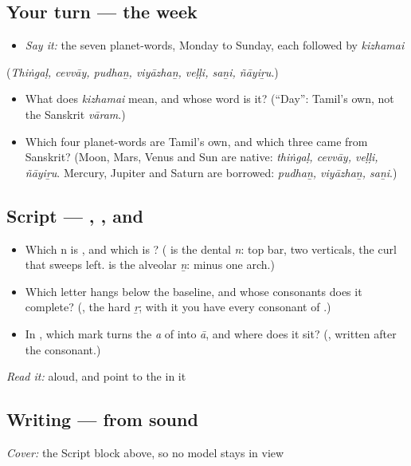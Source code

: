 \subsection*{Your turn — the week}
\begin{itemize}
\raggedright
  \item \emph{Say it:} the seven planet-words, Monday to Sunday, each followed by \emph{kizhamai}
\end{itemize}

(\emph{Thiṅgaḷ, cevvāy, pudhaṉ, viyāzhaṉ, veḷḷi, saṉi, ñāyiṟu}.)

\begin{itemize}
\raggedright
  \item What does \emph{kizhamai} mean, and whose word is it? (\textquotedblleft{}Day\textquotedblright{}: Tamil's own, not the Sanskrit \emph{vāram}.)
  \item Which four planet-words are Tamil's own, and which three came from Sanskrit? (Moon, Mars, Venus and Sun are native: \emph{thiṅgaḷ, cevvāy, veḷḷi, ñāyiṟu}. Mercury, Jupiter and Saturn are borrowed: \emph{pudhaṉ, viyāzhaṉ, saṉi}.)
\end{itemize}

\subsection*{Script — , ,  and }
\begin{itemize}
\raggedright
  \item Which n is \textbf{}, and which is \textbf{}? (\textbf{} is the dental \emph{n}: top bar, two verticals, the curl that sweeps left. \textbf{} is the alveolar \emph{ṉ}: \textbf{} minus one arch.)
  \item Which letter hangs below the baseline, and whose consonants does it complete? (\textbf{}, the hard \emph{ṟ}; with it you have every consonant of \textbf{}.)
  \item In \textbf{}, which mark turns the \emph{a} of \textbf{} into \emph{ā}, and where does it sit? (\textbf{}, written after the consonant.)
\end{itemize}

\emph{Read it:} \textbf{} aloud, and point to the  in it

\subsection*{Writing — from sound}
\emph{Cover:} the Script block above, so no model stays in view


